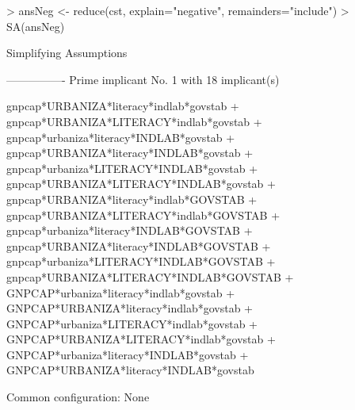 \documentclass[a4paper]{article}
\begin{document}
\begin{Schunk}
\begin{Sinput}
> ansNeg <- reduce(cst, explain="negative", remainders="include")
> SA(ansNeg)
\end{Sinput}
\begin{Soutput}
Simplifying Assumptions

----------------
Prime implicant No. 1 with 18 implicant(s)

gnpcap*URBANIZA*literacy*indlab*govstab + gnpcap*URBANIZA*LITERACY*indlab*govstab +
gnpcap*urbaniza*literacy*INDLAB*govstab + gnpcap*URBANIZA*literacy*INDLAB*govstab +
gnpcap*urbaniza*LITERACY*INDLAB*govstab + gnpcap*URBANIZA*LITERACY*INDLAB*govstab +
gnpcap*URBANIZA*literacy*indlab*GOVSTAB + gnpcap*URBANIZA*LITERACY*indlab*GOVSTAB +
gnpcap*urbaniza*literacy*INDLAB*GOVSTAB + gnpcap*URBANIZA*literacy*INDLAB*GOVSTAB +
gnpcap*urbaniza*LITERACY*INDLAB*GOVSTAB + gnpcap*URBANIZA*LITERACY*INDLAB*GOVSTAB +
GNPCAP*urbaniza*literacy*indlab*govstab + GNPCAP*URBANIZA*literacy*indlab*govstab +
GNPCAP*urbaniza*LITERACY*indlab*govstab + GNPCAP*URBANIZA*LITERACY*indlab*govstab +
GNPCAP*urbaniza*literacy*INDLAB*govstab + GNPCAP*URBANIZA*literacy*INDLAB*govstab

Common configuration: None
\end{Soutput}
\end{Schunk}




\end{document}
